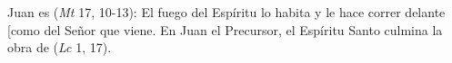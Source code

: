  Juan es  (\emph{Mt} 17, 10-13): El fuego del Espíritu lo habita y le hace correr delante {[}como \textquote{precursor}{]} del Señor que viene. En Juan el Precursor, el Espíritu Santo culmina la obra de  (\emph{Lc} 1, 17).